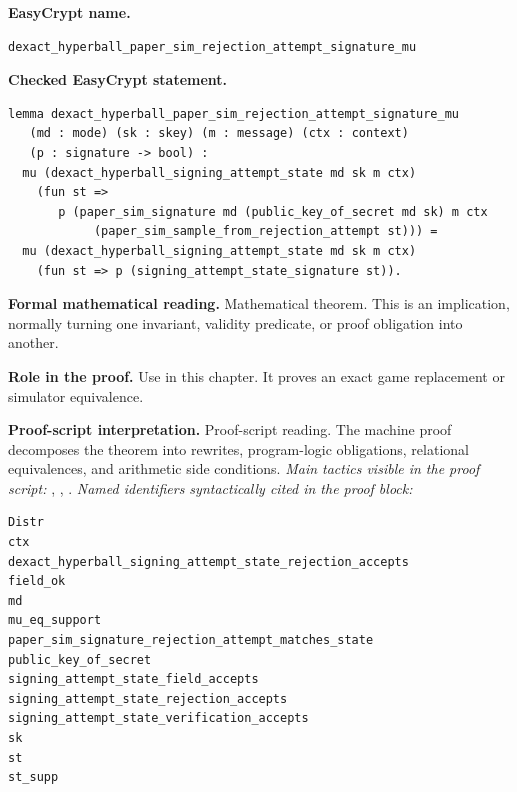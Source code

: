\begin{formaltheorem}
\noindent\textbf{EasyCrypt name.}
\begin{lstlisting}[language=EasyCrypt,basicstyle=\ttfamily\scriptsize]
dexact_hyperball_paper_sim_rejection_attempt_signature_mu
\end{lstlisting}
\noindent\textbf{Checked EasyCrypt statement.}
\begin{lstlisting}[language=EasyCrypt,basicstyle=\ttfamily\scriptsize]
lemma dexact_hyperball_paper_sim_rejection_attempt_signature_mu
   (md : mode) (sk : skey) (m : message) (ctx : context)
   (p : signature -> bool) :
  mu (dexact_hyperball_signing_attempt_state md sk m ctx)
    (fun st =>
       p (paper_sim_signature md (public_key_of_secret md sk) m ctx
            (paper_sim_sample_from_rejection_attempt st))) =
  mu (dexact_hyperball_signing_attempt_state md sk m ctx)
    (fun st => p (signing_attempt_state_signature st)).
\end{lstlisting}
\noindent\textbf{Formal mathematical reading.}
Mathematical theorem. This is an implication, normally turning one invariant, validity predicate, or proof obligation into another.

\noindent\textbf{Role in the proof.}
Use in this chapter. It proves an exact game replacement or simulator equivalence.

\noindent\textbf{Proof-script interpretation.}
Proof-script reading. The machine proof decomposes the theorem into rewrites, program-logic obligations, relational equivalences, and arithmetic side conditions.
\emph{Main tactics visible in the proof script:} , , .
\emph{Named identifiers syntactically cited in the proof block:}
\begin{lstlisting}[language=EasyCrypt,basicstyle=\ttfamily\scriptsize]
Distr
ctx
dexact_hyperball_signing_attempt_state_rejection_accepts
field_ok
md
mu_eq_support
paper_sim_signature_rejection_attempt_matches_state
public_key_of_secret
signing_attempt_state_field_accepts
signing_attempt_state_rejection_accepts
signing_attempt_state_verification_accepts
sk
st
st_supp
\end{lstlisting}

\end{formaltheorem}

